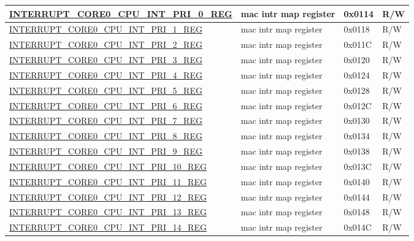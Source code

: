 \begin{longtable}{ | p{6cm} | p{7.2cm} | p{1.3cm} | p{1cm} | }
\hyperref[regdesc:INTERRUPTCORE0CPUINTPRI0REG]{INTERRUPT\_CORE0\_CPU\_INT\_PRI\_0\_REG} & mac intr map register & 0x0114 & R/W \\ \hline
\hyperref[regdesc:INTERRUPTCORE0CPUINTPRI1REG]{INTERRUPT\_CORE0\_CPU\_INT\_PRI\_1\_REG} & mac intr map register & 0x0118 & R/W \\ \hline
\hyperref[regdesc:INTERRUPTCORE0CPUINTPRI2REG]{INTERRUPT\_CORE0\_CPU\_INT\_PRI\_2\_REG} & mac intr map register & 0x011C & R/W \\ \hline
\hyperref[regdesc:INTERRUPTCORE0CPUINTPRI3REG]{INTERRUPT\_CORE0\_CPU\_INT\_PRI\_3\_REG} & mac intr map register & 0x0120 & R/W \\ \hline
\hyperref[regdesc:INTERRUPTCORE0CPUINTPRI4REG]{INTERRUPT\_CORE0\_CPU\_INT\_PRI\_4\_REG} & mac intr map register & 0x0124 & R/W \\ \hline
\hyperref[regdesc:INTERRUPTCORE0CPUINTPRI5REG]{INTERRUPT\_CORE0\_CPU\_INT\_PRI\_5\_REG} & mac intr map register & 0x0128 & R/W \\ \hline
\hyperref[regdesc:INTERRUPTCORE0CPUINTPRI6REG]{INTERRUPT\_CORE0\_CPU\_INT\_PRI\_6\_REG} & mac intr map register & 0x012C & R/W \\ \hline
\hyperref[regdesc:INTERRUPTCORE0CPUINTPRI7REG]{INTERRUPT\_CORE0\_CPU\_INT\_PRI\_7\_REG} & mac intr map register & 0x0130 & R/W \\ \hline
\hyperref[regdesc:INTERRUPTCORE0CPUINTPRI8REG]{INTERRUPT\_CORE0\_CPU\_INT\_PRI\_8\_REG} & mac intr map register & 0x0134 & R/W \\ \hline
\hyperref[regdesc:INTERRUPTCORE0CPUINTPRI9REG]{INTERRUPT\_CORE0\_CPU\_INT\_PRI\_9\_REG} & mac intr map register & 0x0138 & R/W \\ \hline
\hyperref[regdesc:INTERRUPTCORE0CPUINTPRI10REG]{INTERRUPT\_CORE0\_CPU\_INT\_PRI\_10\_REG} & mac intr map register & 0x013C & R/W \\ \hline
\hyperref[regdesc:INTERRUPTCORE0CPUINTPRI11REG]{INTERRUPT\_CORE0\_CPU\_INT\_PRI\_11\_REG} & mac intr map register & 0x0140 & R/W \\ \hline
\hyperref[regdesc:INTERRUPTCORE0CPUINTPRI12REG]{INTERRUPT\_CORE0\_CPU\_INT\_PRI\_12\_REG} & mac intr map register & 0x0144 & R/W \\ \hline
\hyperref[regdesc:INTERRUPTCORE0CPUINTPRI13REG]{INTERRUPT\_CORE0\_CPU\_INT\_PRI\_13\_REG} & mac intr map register & 0x0148 & R/W \\ \hline
\hyperref[regdesc:INTERRUPTCORE0CPUINTPRI14REG]{INTERRUPT\_CORE0\_CPU\_INT\_PRI\_14\_REG} & mac intr map register & 0x014C & R/W \\ \hline

\end{longtable}
